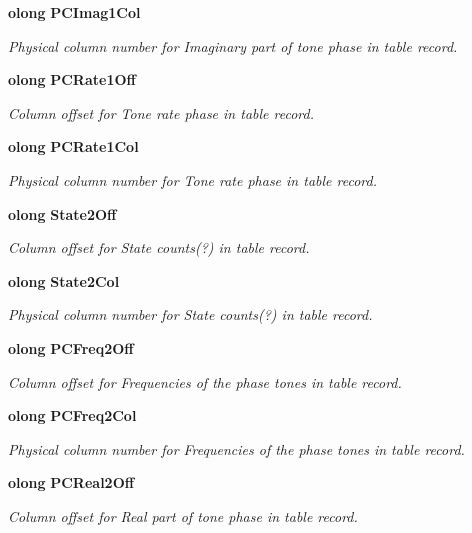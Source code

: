 \begin{CompactItemize}
{\bf olong} {\bf PCImag1Col}
\begin{CompactList}\small\item\em Physical column number for Imaginary part of tone phase in table record. \item\end{CompactList}\item 
{\bf olong} {\bf PCRate1Off}
\begin{CompactList}\small\item\em Column offset for Tone rate phase in table record. \item\end{CompactList}\item 
{\bf olong} {\bf PCRate1Col}
\begin{CompactList}\small\item\em Physical column number for Tone rate phase in table record. \item\end{CompactList}\item 
{\bf olong} {\bf State2Off}
\begin{CompactList}\small\item\em Column offset for State counts(?) in table record. \item\end{CompactList}\item 
{\bf olong} {\bf State2Col}
\begin{CompactList}\small\item\em Physical column number for State counts(?) in table record. \item\end{CompactList}\item 
{\bf olong} {\bf PCFreq2Off}
\begin{CompactList}\small\item\em Column offset for Frequencies of the phase tones in table record. \item\end{CompactList}\item 
{\bf olong} {\bf PCFreq2Col}
\begin{CompactList}\small\item\em Physical column number for Frequencies of the phase tones in table record. \item\end{CompactList}\item 
{\bf olong} {\bf PCReal2Off}
\begin{CompactList}\small\item\em Column offset for Real part of tone phase in table record. \item\end{CompactList}\item 

\end{CompactItemize}
